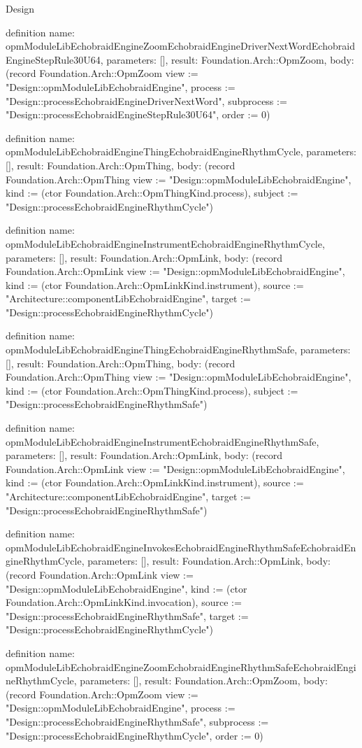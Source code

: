\begin{lexlean}{Design}
\begin{semanticmodule}
definition{
  name: opmModuleLibEchobraidEngineZoomEchobraidEngineDriverNextWordEchobraidEngineStepRule30U64,
  parameters: [],
  result: Foundation.Arch::OpmZoom,
  body: (record Foundation.Arch::OpmZoom {view := "Design::opmModuleLibEchobraidEngine", process := "Design::processEchobraidEngineDriverNextWord", subprocess := "Design::processEchobraidEngineStepRule30U64", order := 0})
}

definition{
  name: opmModuleLibEchobraidEngineThingEchobraidEngineRhythmCycle,
  parameters: [],
  result: Foundation.Arch::OpmThing,
  body: (record Foundation.Arch::OpmThing {view := "Design::opmModuleLibEchobraidEngine", kind := (ctor Foundation.Arch::OpmThingKind.process), subject := "Design::processEchobraidEngineRhythmCycle"})
}

definition{
  name: opmModuleLibEchobraidEngineInstrumentEchobraidEngineRhythmCycle,
  parameters: [],
  result: Foundation.Arch::OpmLink,
  body: (record Foundation.Arch::OpmLink {view := "Design::opmModuleLibEchobraidEngine", kind := (ctor Foundation.Arch::OpmLinkKind.instrument), source := "Architecture::componentLibEchobraidEngine", target := "Design::processEchobraidEngineRhythmCycle"})
}

definition{
  name: opmModuleLibEchobraidEngineThingEchobraidEngineRhythmSafe,
  parameters: [],
  result: Foundation.Arch::OpmThing,
  body: (record Foundation.Arch::OpmThing {view := "Design::opmModuleLibEchobraidEngine", kind := (ctor Foundation.Arch::OpmThingKind.process), subject := "Design::processEchobraidEngineRhythmSafe"})
}

definition{
  name: opmModuleLibEchobraidEngineInstrumentEchobraidEngineRhythmSafe,
  parameters: [],
  result: Foundation.Arch::OpmLink,
  body: (record Foundation.Arch::OpmLink {view := "Design::opmModuleLibEchobraidEngine", kind := (ctor Foundation.Arch::OpmLinkKind.instrument), source := "Architecture::componentLibEchobraidEngine", target := "Design::processEchobraidEngineRhythmSafe"})
}

definition{
  name: opmModuleLibEchobraidEngineInvokesEchobraidEngineRhythmSafeEchobraidEngineRhythmCycle,
  parameters: [],
  result: Foundation.Arch::OpmLink,
  body: (record Foundation.Arch::OpmLink {view := "Design::opmModuleLibEchobraidEngine", kind := (ctor Foundation.Arch::OpmLinkKind.invocation), source := "Design::processEchobraidEngineRhythmSafe", target := "Design::processEchobraidEngineRhythmCycle"})
}

definition{
  name: opmModuleLibEchobraidEngineZoomEchobraidEngineRhythmSafeEchobraidEngineRhythmCycle,
  parameters: [],
  result: Foundation.Arch::OpmZoom,
  body: (record Foundation.Arch::OpmZoom {view := "Design::opmModuleLibEchobraidEngine", process := "Design::processEchobraidEngineRhythmSafe", subprocess := "Design::processEchobraidEngineRhythmCycle", order := 0})
}


\end{semanticmodule}
\end{lexlean}
